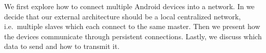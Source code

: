 We first explore how to connect multiple Android devices into a network.
In  we decide that our external architecture should be a local centralized network, i.e.\ multiple slaves which each connect to the same master.
Then we present how the devices communicate through persistent connections.
Lastly, we discuss which data to send and how to transmit it.

